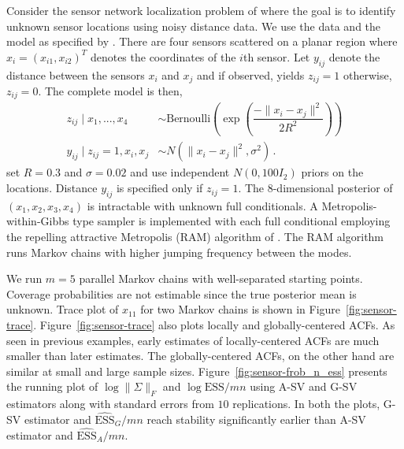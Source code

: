 \documentclass[12pt]{article}
\theoremstyle{remark}
\begin{document}
Consider the sensor network localization problem of \cite{ihler2005nonparametric} where the goal is to identify unknown sensor locations using noisy distance data. We use the data and the model as specified by \cite{tak2018repelling}. There are four sensors scattered on a planar region where $x_i = (x_{i1}, x_{i2})^T$ denotes the coordinates of the $i${th} sensor. Let $y_{ij}$ denote the distance between the sensors $x_i$ and $x_j$ and if observed, yields $z_{ij} = 1$ otherwise, $z_{ij} = 0$. The complete model is then,
\begin{align*}
    z_{ij} \mid x_1, ..., x_4 & \sim \text{Bernoulli}\left(\exp\left(\dfrac{-\|x_i - x_j\|^2}{2R^2}\right)\right)\\
    y_{ij} \mid z_{ij} = 1, x_i,x_j &\sim N \left(\|x_i - x_j\|^2, \sigma^2 \right)\,.
\end{align*}
%
\cite{tak2018repelling} set $R = 0.3$ and $\sigma = 0.02$ and use independent $N(0, 100I_2)$ priors on the locations. Distance $y_{ij}$ is specified only if $z_{ij} = 1$. The $8$-dimensional posterior of $(x_1, x_2, x_3, x_4)$ is intractable with unknown full conditionals. A Metropolis-within-Gibbs type sampler is implemented with each full conditional employing the repelling attractive Metropolis (RAM) algorithm of \cite{tak2018repelling}. The RAM algorithm runs Markov chains with higher jumping frequency between the modes.

We run $m = 5$ parallel Markov chains with well-separated starting points. Coverage probabilities are not estimable since the true posterior mean is unknown. Trace plot of $x_{11}$ for two Markov chains is shown in Figure~\ref{fig:sensor-trace}. Figure~\ref{fig:sensor-trace} also  plots locally and globally-centered ACFs. As seen in previous examples, early estimates of locally-centered ACFs are much smaller than later estimates. The globally-centered ACFs, on the other hand are similar at small and large sample sizes. Figure~\ref{fig:sensor-frob_n_ess} presents the running plot of $\log \|{\Sigma}\|_F$ and $\log \textrm{ESS}/mn$ using A-SV and G-SV  estimators along with standard errors from $10$ replications. In both the plots, G-SV estimator and $\widehat{\textrm{ESS}}_G/mn$ reach stability significantly earlier than A-SV estimator and $\widehat{\textrm{ESS}}_A/mn$.
\end{document}
